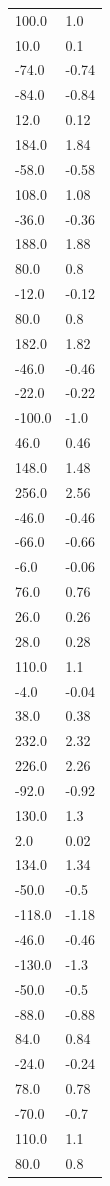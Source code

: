 \begin{longtable}{ll}
100.0 & 1.0 \\
10.0 & 0.1 \\
-74.0 & -0.74 \\
-84.0 & -0.84 \\
12.0 & 0.12 \\
184.0 & 1.84 \\
-58.0 & -0.58 \\
108.0 & 1.08 \\
-36.0 & -0.36 \\
188.0 & 1.88 \\
80.0 & 0.8 \\
-12.0 & -0.12 \\
80.0 & 0.8 \\
182.0 & 1.82 \\
-46.0 & -0.46 \\
-22.0 & -0.22 \\
-100.0 & -1.0 \\
46.0 & 0.46 \\
148.0 & 1.48 \\
256.0 & 2.56 \\
-46.0 & -0.46 \\
-66.0 & -0.66 \\
-6.0 & -0.06 \\
76.0 & 0.76 \\
26.0 & 0.26 \\
28.0 & 0.28 \\
110.0 & 1.1 \\
-4.0 & -0.04 \\
38.0 & 0.38 \\
232.0 & 2.32 \\
226.0 & 2.26 \\
-92.0 & -0.92 \\
130.0 & 1.3 \\
2.0 & 0.02 \\
134.0 & 1.34 \\
-50.0 & -0.5 \\
-118.0 & -1.18 \\
-46.0 & -0.46 \\
-130.0 & -1.3 \\
-50.0 & -0.5 \\
-88.0 & -0.88 \\
84.0 & 0.84 \\
-24.0 & -0.24 \\
78.0 & 0.78 \\
-70.0 & -0.7 \\
110.0 & 1.1 \\
80.0 & 0.8 \\

\end{longtable}

